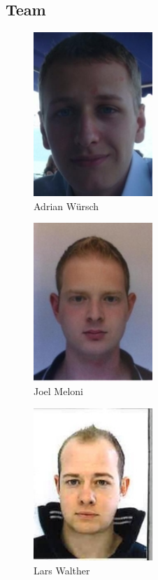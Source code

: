 \subsection{Team}

\begin{figure}[H]
\includegraphics[width=0.4\textwidth]{./04_Projektmanagement/fig/adrianwuersch.jpg}
	\caption{Adrian Würsch}
\end{figure}

\begin{figure}[H]
	\includegraphics[width=0.4\textwidth]{./04_Projektmanagement/fig/joelmeloni.jpg}
	\caption{Joel Meloni}
\end{figure}

\begin{figure}[H]
	\includegraphics[width=0.4\textwidth]{./04_Projektmanagement/fig/larswalther.jpg}
	\caption{Lars Walther}
\end{figure}

